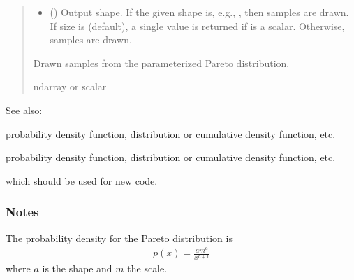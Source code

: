 \documentclass[letterpaper,10pt,english]{sphinxmanual}
\begin{document}
\begin{fulllineitems}
\begin{quote}
\begin{description}
\begin{itemize}
\item {} 
\sphinxAtStartPar
{} (\sphinxstyleliteralemphasis{\sphinxupquote{, }}) \textendash{} Output shape.  If the given shape is, e.g., , then
 samples are drawn.  If size is  (default),
a single value is returned if  is a scalar.  Otherwise,
 samples are drawn.

\end{itemize}

\sphinxAtStartPar
{} \textendash{} Drawn samples from the parameterized Pareto distribution.

\sphinxAtStartPar
ndarray or scalar

\end{description}\end{quote}


\begin{sphinxseealso}{See also:}
\begin{description}
\sphinxAtStartPar
probability density function, distribution or cumulative density function, etc.

\sphinxAtStartPar
probability density function, distribution or cumulative density function, etc.

\sphinxAtStartPar
which should be used for new code.

\end{description}


\end{sphinxseealso}

\subsubsection*{Notes}

\sphinxAtStartPar
The probability density for the Pareto distribution is
\begin{equation*}
\begin{split}p(x) = \frac{am^a}{x^{a+1}}\end{split}
\end{equation*}
\sphinxAtStartPar
where \(a\) is the shape and \(m\) the scale.


\end{fulllineitems}
\end{document}
